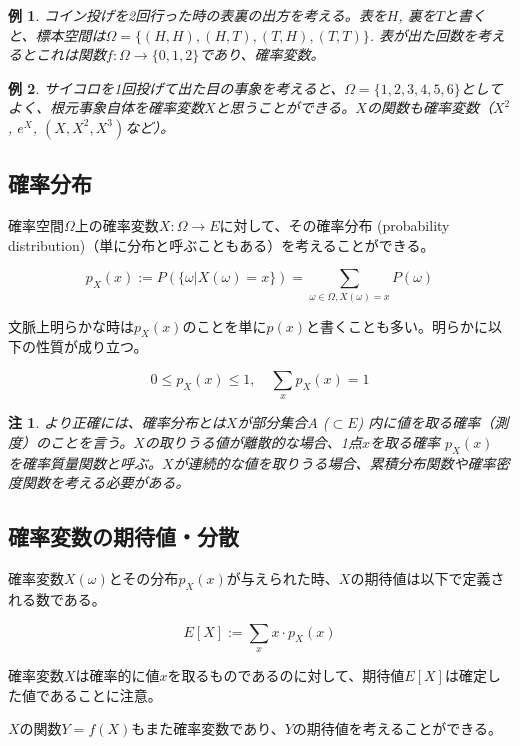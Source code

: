 \documentclass[uplatex,dvipdfmx]{jlreq}
\newcommand\term[1]{\textsf{#1}}
\newtheorem{example}{例}
\newtheorem{note}{注}
\begin{document}
\begin{example}
    コイン投げを2回行った時の表裏の出方を考える。表を$H$, 裏を$T$と書くと、標本空間は$\Omega=\{(H, H), (H, T), (T, H), (T, T)\}$. 表が出た回数を考えるとこれは関数$f\colon \Omega \to \{0, 1, 2\}$であり、確率変数。
\end{example}

\begin{example}
    サイコロを1回投げて出た目の事象を考えると、$\Omega=\{1, 2, 3, 4, 5, 6\}$としてよく、根元事象自体を確率変数$X$と思うことができる。$X$の関数も確率変数（$X^2$, $e^X$, $(X, X^2, X^3)$など）。
\end{example}

\subsection{確率分布}

確率空間$\Omega$上の確率変数$X\colon \Omega \to E$に対して、その\term{確率分布 (probability distribution)}（単に分布と呼ぶこともある）を考えることができる。

\[
    p_X(x) := P(\{\omega | X(\omega) = x\})
    = \sum_{\omega \in \Omega, X(\omega) = x} P(\omega)
\]

文脈上明らかな時は$p_X(x)$のことを単に$p(x)$と書くことも多い。明らかに以下の性質が成り立つ。

\[
    0 \leq p_X(x) \leq 1, \quad \sum_x p_X(x) = 1
\]

\begin{note}
    より正確には、確率分布とは$X$が部分集合$A$ ($\subset E$) 内に値を取る確率（測度）のことを言う。$X$の取りうる値が離散的な場合、1点$x$を取る確率 $p_X(x)$ を\term{確率質量関数}と呼ぶ。$X$が連続的な値を取りうる場合、\term{累積分布関数}や\term{確率密度関数}を考える必要がある。
\end{note}

\subsection{確率変数の期待値・分散}

確率変数$X(\omega)$とその分布$p_X(x)$が与えられた時、$X$の\term{期待値}は以下で定義される数である。

\[
    E[X] := \sum_x x \cdot p_X(x)
\]

確率変数$X$は確率的に値$x$を取るものであるのに対して、期待値$E[X]$は確定した値であることに注意。

$X$の関数$Y=f(X)$もまた確率変数であり、$Y$の期待値を考えることができる。
\end{document}
